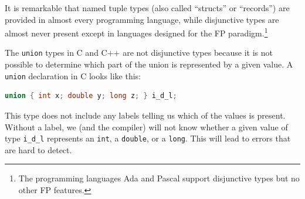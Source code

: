 It is remarkable that named tuple types (also called \textsf{``}structs\textsf{''}
or \textsf{``}records\textsf{''}) are provided in almost every programming language,
while disjunctive types are almost never present except in languages
designed for the FP paradigm.\footnote{The programming languages Ada and Pascal support disjunctive types
but no other FP features.}

The \lstinline!union! types in C and C++ are not disjunctive types
because it is not possible to determine which part of the union is
represented by a given value. A \lstinline!union! declaration in
C looks like this:
\begin{lstlisting}[language=C]
union { int x; double y; long z; } i_d_l;
\end{lstlisting}
This type does not include any labels telling us which of the values
is present. Without a label, we (and the compiler) will not know whether
a given value of type \lstinline!i_d_l! represents an \lstinline!int!,
a \lstinline!double!, or a \lstinline!long!. This will lead to errors
that are hard to detect.

